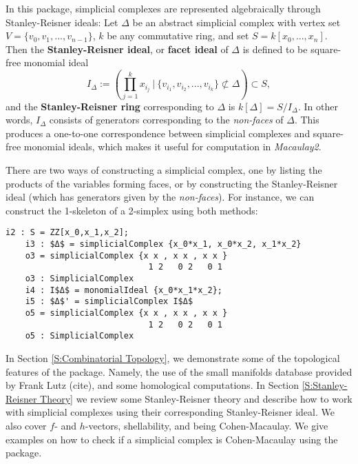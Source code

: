 \documentclass[12pt,leqno]{amsart}
\theoremstyle{definition}
\newenvironment{example}
{\pushQED{\qed}\renewcommand{\qedsymbol}{$\diamond$}\examplex}
{\popQED\endexamplex}
\begin{document}
In this package, simplicial complexes are represented algebraically through Stanley-Reisner ideals: Let $\Delta$ be an abstract simplicial complex with vertex set $V = \{v_0,v_1,...,v_{n-1}\}$, $k$ be any commutative ring, and set $S = k[x_0,...,x_n]$. Then the \textbf{Stanley-Reisner ideal}, or \textbf{facet ideal} of $\Delta$ is defined to be square-free monomial ideal
%
\begin{displaymath}
  I_\Delta := \left( \prod_{j=1}^k x_{i_j} \ \bigg\vert \ \{ v_{i_1},v_{i_2},...,v_{i_k} \} \not \subset \Delta \right) \subset S,
\end{displaymath}
%
and the \textbf{Stanley-Reisner ring} corresponding to $\Delta$ is $k[\Delta] = S/I_\Delta$. In other words, $I_\Delta$ consists of generators corresponding to the \textit{non-faces} of $\Delta$. This produces a one-to-one correspondence between simplicial complexes and square-free monomial ideals, which makes it useful for computation in \textit{Macaulay2}.

\begin{example}\label{example of using database}
  There are two ways of constructing a simplicial complex, one by listing the products of the variables forming faces, or by constructing the Stanley-Reisner ideal (which has generators given by the \textit{non-faces}). For instance, we can construct the 1-skeleton of a 2-simplex using both methods:
  \begin{lstlisting}[basicstyle={\ttfamily \scriptsize}, xleftmargin=-23pt]
    i2 : S = ZZ[x_0,x_1,x_2];
    i3 : $Δ$ = simplicialComplex {x_0*x_1, x_0*x_2, x_1*x_2}
    o3 = simplicialComplex {x x , x x , x x }
                             1 2   0 2   0 1
    o3 : SimplicialComplex
    i4 : I$Δ$ = monomialIdeal {x_0*x_1*x_2};
    i5 : $Δ$' = simplicialComplex I$Δ$
    o5 = simplicialComplex {x x , x x , x x }
                             1 2   0 2   0 1
    o5 : SimplicialComplex
  \end{lstlisting}
\end{example}

In Section \ref{S:Combinatorial Topology}, we demonstrate some of the topological features of the package. Namely, the use of the small manifolds database provided by Frank Lutz (cite), and some homological computations. In Section \ref{S:Stanley-Reisner Theory} we review some Stanley-Reisner theory and describe how to work with simplicial complexes using their corresponding Stanley-Reisner ideal. We also cover $f$- and $h$-vectors, shellability, and being Cohen-Macaulay. We give examples on how to check if a simplicial complex is Cohen-Macaulay using the package.
\end{document}
